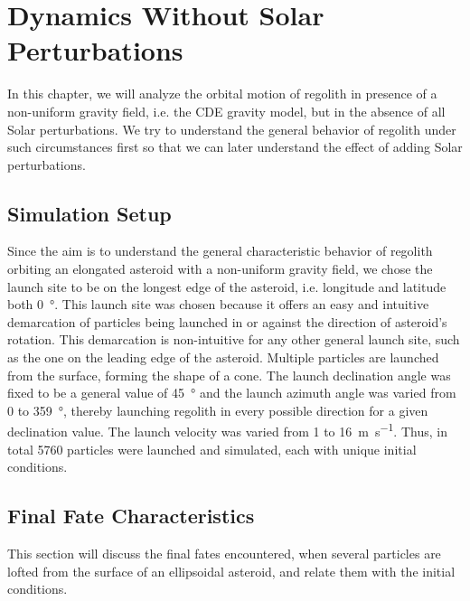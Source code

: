 \chapter{Dynamics Without Solar Perturbations}
\label{chap:dynamics_without_solar_perturbations}
\graphicspath{{Results/}}

In this chapter, we will analyze the orbital motion of regolith in presence of a non-uniform gravity field, i.e. the \gls{CDE} gravity model, but in the absence of all Solar perturbations. We try to understand the general behavior of regolith under such circumstances first so that we can later understand the effect of adding Solar perturbations.

\section{Simulation Setup}
\label{sec:simulation_setup_noSP}
Since the aim is to understand the general characteristic behavior of regolith orbiting an elongated asteroid with a non-uniform gravity field, we chose the launch site to be on the longest edge of the asteroid, i.e. longitude and latitude both \SI{0}{\degree}. This launch site was chosen because it offers an easy and intuitive demarcation of particles being launched in or against the direction of asteroid's rotation. This demarcation is non-intuitive for any other general launch site, such as the one on the leading edge of the asteroid.
%
\newline\newline
%
Multiple particles are launched from the surface, forming the shape of a cone. The launch declination angle was fixed to be a general value of \SI{45}{\degree} and the launch azimuth angle was varied from 0 to \SI{359}{\degree}, thereby launching regolith in every possible direction for a given declination value. The launch velocity was varied from 1 to \SI{16}{\metre \per \second}. Thus, in total 5760 particles were launched and simulated, each with unique initial conditions.

\section{Final Fate Characteristics}
\label{sec:final_fate_characteristics_noSP}
This section will discuss the final fates encountered, when several particles are lofted from the surface of an ellipsoidal asteroid, and relate them with the initial conditions.

